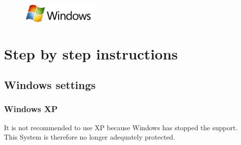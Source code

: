 \documentclass[a4paper,12pt]{scrartcl}
\newcommand{\optemph}[1]{\textbf{#1}}
\begin{document}
\newpage
\enlargethispage{20pt}

\begin{figure}[t!]
    \raggedleft
    \vspace{-20pt}
    \includegraphics[height=1cm,keepaspectratio]{Bilder/Windows_logo}
    \vspace{-20pt}
\end{figure}

\section*{Step by step instructions}
\subsection*{Windows settings}
\subsubsection*{Windows XP}
It is not recommended to use XP because Windows has stopped the support. This System is therefore no longer adequately protected.
\end{document}
